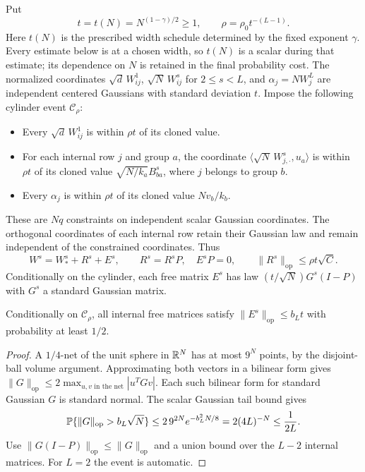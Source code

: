 \documentclass[11pt]{article}
\theoremstyle{remark}\newtheorem{remark}[theorem]{Remark}
\begin{document}
Put
\begin{equation}\label{eq:cylinder-radius}
 t=t(N)=N^{(1-\gamma)/2}\ge1,
 \qquad \rho=\rho_0t^{-(L-1)}.
\end{equation}
Here $t(N)$ is the prescribed width schedule determined by the fixed
exponent $\gamma$. Every estimate below is at a chosen width, so $t(N)$
is a scalar during that estimate; its dependence on $N$ is retained in
the final probability cost.
The normalized coordinates $\sqrt d\,W^1_{ij}$,
$\sqrt N\,W^s_{ij}$ for $2\le s<L$, and $\alpha_j=NW^L_j$
are independent centered Gaussians with standard deviation $t$.
Impose the following cylinder event $\mathcal C_\rho$:

\begin{itemize}
\item Every $\sqrt d\,W^1_{ij}$ is within $\rho t$ of its cloned value.
\item For each internal row $j$ and group $a$, the coordinate
$\langle\sqrt N\,W^s_{j,\cdot},u_a\rangle$ is within $\rho t$ of
its cloned value $\sqrt{N/k_a}B^s_{ba}$, where $j$ belongs to group $b$.
\item Every $\alpha_j$ is within $\rho t$ of its cloned value $Nv_b/k_b$.
\end{itemize}

These are $Nq$ constraints on independent scalar Gaussian coordinates.
The orthogonal coordinates of each internal row retain their Gaussian
law and remain independent of the constrained coordinates. Thus
\[
 W^s=W_*^s+R^s+E^s,
 \qquad R^s=R^sP,\quad E^sP=0,
 \qquad \|R^s\|_{\mathrm{op}}\le\rho t\sqrt C.
\]
Conditionally on the cylinder, each free matrix $E^s$ has law
$(t/\sqrt N)G^s(I-P)$ with $G^s$ a standard Gaussian matrix.

\begin{lemma}\label{lem:operator}
Conditionally on $\mathcal C_\rho$, all internal free matrices satisfy
$\|E^s\|_{\mathrm{op}}\le b_Lt$ with probability at least $1/2$.
\end{lemma}
\begin{proof}
A $1/4$-net of the unit sphere in $\mathbb R^N$ has at most $9^N$ points,
by the disjoint-ball volume argument. Approximating both vectors in a
bilinear form gives
$\|G\|_{\mathrm{op}}\le2\max_{u,v\text{ in the net}}|u^TGv|$.
Each such bilinear form for standard Gaussian $G$ is standard normal.
The scalar Gaussian tail bound gives
\[
 \mathbb P\{\|G\|_{\mathrm{op}}>b_L\sqrt N\}
 \le2\,9^{2N}e^{-b_L^2N/8}
 =2(4L)^{-N}\le\frac1{2L}.
\]
Use $\|G(I-P)\|_{\mathrm{op}}\le\|G\|_{\mathrm{op}}$ and a union
bound over the $L-2$ internal matrices. For $L=2$ the event is automatic.
\end{proof}
\end{document}
